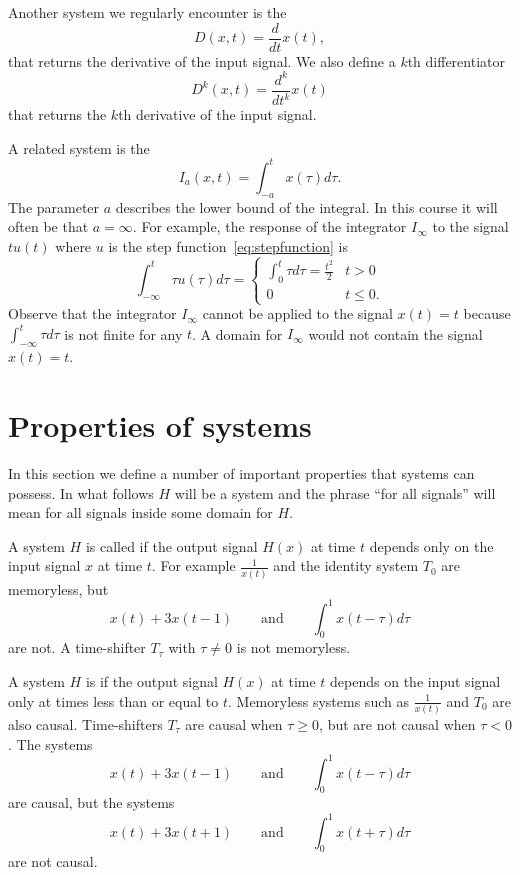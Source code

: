 Another system we regularly encounter is the 
\[
D(x,t) = \frac{d}{dt} x(t),
\]
that returns the derivative of the input signal.  We also define a $k$th differentiator
\[
D^k(x,t) = \frac{d^k}{dt^k} x(t)
\]
that returns the $k$th derivative of the input signal.  %

A related system is the 
\[
I_a(x,t) = \int_{-a}^{t} x(\tau) d\tau.
\]
The parameter $a$ describes the lower bound of the integral.  In this course it will often be that $a=\infty$.  For example, the response of the integrator $I_{\infty}$ to the signal $t u(t)$ where $u$ is the step function~\eqref{eq:stepfunction} is
\[
\int_{-\infty}^{t} \tau u(\tau) d\tau = \begin{cases}
\int_{0}^{t} \tau d\tau = \frac{t^2}{2} & t > 0 \\
0 & t \leq 0.
\end{cases}
\]
Observe that the integrator $I_\infty$ cannot be applied to the signal $x(t) = t$ because $\int_{-\infty}^{t} \tau d\tau$ is not finite for any $t$.  A domain for $I_\infty$ would not contain the signal $x(t) = t$. 

\section{Properties of systems}

In this section we define a number of important properties that systems can possess.  In what follows $H$ will be a system and the phrase ``for all signals'' will mean for all signals inside some domain for $H$.  %

A system $H$ is called  if the output signal $H(x)$ at time $t$ depends only on the input signal $x$ at time $t$.  For example $\frac{1}{x(t)}$ and the identity system $T_0$ are memoryless, but 
\[
x(t) + 3 x(t-1) \qquad \text{and} \qquad \int_{0}^{1} x(t - \tau) d\tau
\] 
are not.  A time-shifter $T_\tau$ with $\tau \neq 0$ is not memoryless.

A system $H$ is  if the output signal $H(x)$ at time $t$ depends on the input signal only at times less than or equal to $t$.  Memoryless systems such as $\frac{1}{x(t)}$ and $T_0$ are also causal.  Time-shifters $T_\tau$ are causal when $\tau \geq 0$, but are not causal when $\tau < 0$.  The systems 
\[
x(t) + 3 x(t-1) \qquad \text{and} \qquad \int_{0}^{1} x(t - \tau) d\tau
\] 
are causal, but the systems 
\[
x(t) + 3 x(t+1) \qquad \text{and} \qquad \int_{0}^{1} x(t + \tau) d\tau
\] 
are not causal.

